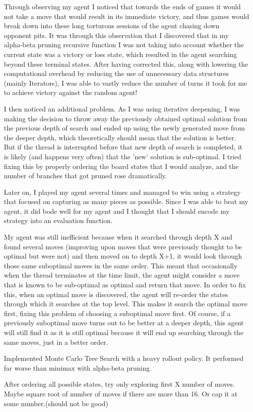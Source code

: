 \documentclass{article}
\begin{document}
Through observing my agent I noticed that towards the ends of games it would not take a move that would result in its immediate victory, and thus
games would break down into these long torturous sessions of the agent chasing down opponent pits. It was through this observation that
I discovered that in my alpha-beta pruning recursive function I was not taking into account whether the current state was a victory or loss state,
which resulted in the agent searching beyond these terminal states. After having corrected this, along with lowering the computational overhead by reducing
the use of unnecessary data structures (mainly Iterators), I was able to vastly reduce the number of turns it took for me to achieve victory against 
the random agent!

I then noticed an additional problem. As I was using iterative deepening, I was making the decision to throw away the previously obtained optimal solution from the
previous depth of search and ended up using the newly generated move from the deeper depth, which theoretically should mean that the solution is better. But if the thread
is interrupted before that new depth of search is completed, it is likely (and happens very often) that the 'new' solution is sub-optimal. I tried fixing this by properly ordering
the board states that I would analyze, and the number of branches that got pruned rose dramatically.

Later on, I played my agent several times and managed to win using a strategy that focused on capturing as many pieces as possible. Since I was able to beat my agent, it
did bode well for my agent and I thought that I should encode my strategy into an evaluation function.

My agent was still inefficient because when it searched through depth X and found several moves (improving upon moves that were previously thought to be optimal but were not)
and then moved on to depth X+1, it would look through those same suboptimal moves in the same order. This meant that occasionally when the thread terminates at the time
limit, the agent might consider a move that is known to be sub-optimal as optimal and return that move. In order to fix this, when an optimal move is discovered, the agent
will re-order the states through which it searches at the top level. This makes it search the optimal move first, fixing this problem of choosing a suboptimal move first.
Of course, if a previously suboptimal move turns out to be better at a deeper depth, this agent will still find it as it is still optimal because it will end up searching
through the same moves, just in a better order.

Implemented Monte Carlo Tree Search with a heavy rollout policy. It performed far worse than minimax with alpha-beta pruning.

After ordering all possible states, try only exploring first X number of moves. Maybe square root of number of moves if there are more than 16. Or cap it at some number.(should not be good)
\end{document}
